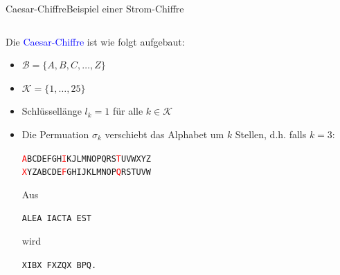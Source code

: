 \documentclass{beamer}
\newcommand{\mc}{\mathcal}
\newcommand{\tb}[1]{{\textcolor{blue}{#1}}}
\newcommand{\tred}[1]{{\textcolor{red}{#1}}}
\theoremstyle{plain}
\begin{document}
\begin{frame}{Caesar-Chiffre}{Beispiel einer Strom-Chiffre}
 \begin{columns}[T]
  \begin{column}{.7\textwidth}
 Die \tb{Caesar-Chiffre} ist wie folgt aufgebaut: 
 \begin{itemize}
  \item $\mc B = \{A, B, C, \dots, Z\}$
  \item $\mc K = \{1, \dots, 25\}$
  \item Schlüssellänge $l_k = 1$ für alle $k \in \mc K$ \pause
  \item Die Permuation $\sigma_k$ verschiebt das Alphabet um $k$ Stellen, d.h. falls $k = 3$:
  \begin{center}
 \texttt{\tred{A}BCDEFGH\tred{I}KJLMNOPQRS\tred{T}UVWXYZ}\\
 \texttt{\tred{X}YZABCDE\tred{F}GHIJKLMNOP\tred{Q}RSTUVW}
 \end{center}
 Aus
 \begin{center} 
\texttt{ALEA IACTA EST}  
 \end{center}
 wird 
 \begin{center}
\texttt{XIBX FXZQX BPQ.}  
 \end{center} 
 \end{itemize}
 \end{column}
 

\end{columns}
\end{frame}
\end{document}
